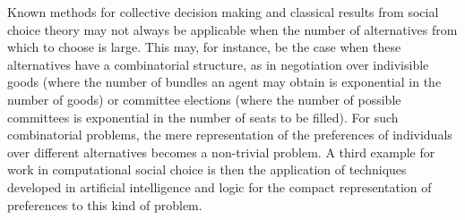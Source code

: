 \documentclass{comsoc2018}
\begin{document}
Known methods for collective decision making and classical results from 
social choice theory may not always be applicable when the number of 
alternatives from which to choose is large. This may, for instance, be 
the case when these alternatives have a combinatorial structure, as in 
negotiation over indivisible goods (where the number of bundles an agent 
may obtain is exponential in the number of goods) or committee elections 
(where the number of possible committees is exponential in the number 
of seats to be filled). For such combinatorial problems, the mere 
representation of the preferences of individuals over different 
alternatives becomes a non-trivial problem. A third example for work 
in computational social choice is then the application of techniques 
developed in artificial intelligence and logic for the compact 
representation of preferences to this kind of problem. 


\end{document}
